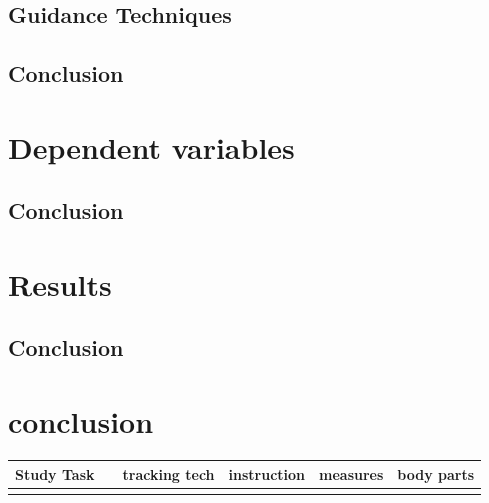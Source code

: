 \subsection{Guidance Techniques}
\subsection{Conclusion}

\section{Dependent variables}
\subsection{Conclusion}

\section{Results}
\subsection{Conclusion}



\section{conclusion}
\begin{table}[]
	\begin{tabular}{|l|l|l|l|l|l|}
		\hline
		Study Task &  & tracking tech & instruction & measures & body parts  \\ \hline
		&  &  &  &  &  \\ \hline
	\end{tabular}
\end{table}

